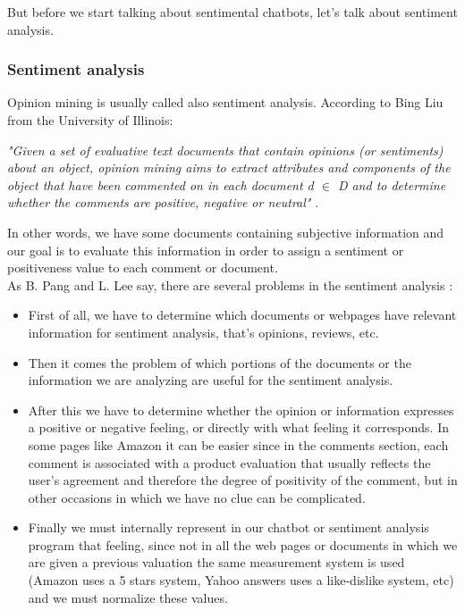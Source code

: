 \documentclass[12pt,twoside]{article}
\theoremstyle{plain}
\theoremstyle{definition}
\theoremstyle{remark}
\begin{document}
	But before we start talking about sentimental chatbots, let's talk about sentiment analysis.
	
		\subsubsection{Sentiment analysis}
		\label{sec::sentiment_analysis}
		
		Opinion mining is usually called also sentiment analysis. According to Bing Liu from the University of Illinois: \\
		
		\begin{center}
			\textit{"Given a set of evaluative text documents that contain opinions (or sentiments) about an object, opinion mining aims to extract attributes and components of the object that have been commented on in each document d $\in$ D and to determine whether the comments are positive, negative or neutral"} \cite{bingliu_sentiment_definition}.
		\end{center}
		
		In other words, we have some documents containing subjective information and our goal is to evaluate this information in order to assign a sentiment or positiveness value to each comment or document.\\
		
		As B. Pang and L. Lee say, there are several problems in the sentiment analysis \cite{sentiment_analysis_bpang_llee}:
		
		\begin{itemize}
			\item First of all, we have to determine which documents or webpages have relevant information for sentiment analysis, that's opinions, reviews, etc.
			\item Then it comes the problem of which portions of the documents or the information we are analyzing are useful for the sentiment analysis.
			\item After this we have to determine whether the opinion or information expresses a positive or negative feeling, or directly with what feeling it corresponds. In some pages like 
					Amazon it can be easier since in the comments section, each comment is associated with a product evaluation that usually reflects the user's agreement and therefore the degree of positivity of the comment, but in other occasions in which we have no clue can be complicated.
			\item Finally we must internally represent in our chatbot or sentiment analysis program that feeling, since not in all the web pages or documents in which we are given a previous
				 	valuation the same measurement system is used (Amazon uses a 5 stars system, Yahoo answers uses a like-dislike system, etc) and we must normalize these values.
		\end{itemize}
	
\end{document}

